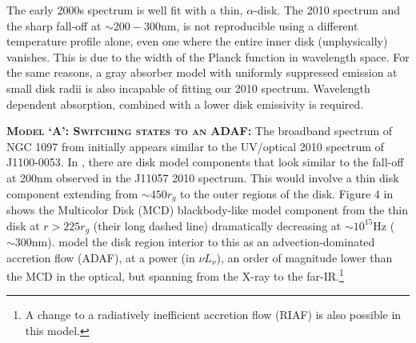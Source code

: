 \documentclass[11pt,a4paper]{article}
\begin{document}
The early 2000s spectrum is well fit with a thin, \citet{SS73} $\alpha$-disk. The 2010 spectrum and the sharp fall-off at $\sim 200-300$nm, is not reproducible using a different temperature profile alone, even one where the entire inner disk (unphysically) vanishes. This is due to the width of the Planck function in wavelength space. For the same reasons, a gray absorber model with uniformly suppressed emission at small disk radii is also incapable of fitting our 2010 \citep[or ][]{Guo2016} spectrum. Wavelength dependent absorption, combined with a lower disk emissivity is required. 


\smallskip \smallskip
\noindent
\textbf{\textsc{Model `A': Switching states to an ADAF: }}
The broadband spectrum of NGC 1097 from \citet{Nemmen2006} initially appears similar to the UV/optical 2010 spectrum of J1100-0053.  In \citet[][e.g., their Figure 4]{Nemmen2006}, there are disk model components that look similar to the fall-off at 200nm observed in the J11057 2010 spectrum. This would involve a thin disk component extending from $\sim 450r_{g}$ to the outer regions of the disk. Figure 4 in \citet{Nemmen2006} shows the Multicolor Disk (MCD) blackbody-like model component from the thin disk at $r>225r_{g}$ (their long dashed line) dramatically decreasing at $\sim 10^{15}$Hz ($\sim 300$nm). \citet{Nemmen2006} model the disk region interior to this as an advection-dominated accretion flow (ADAF), at a power (in $\nu L_{\nu}$), an order of magnitude lower than the MCD in the optical, but spanning from the X-ray to the far-IR.\footnote{A change to  a radiatively inefficient accretion flow (RIAF) is also possible in this model.}
\end{document}
